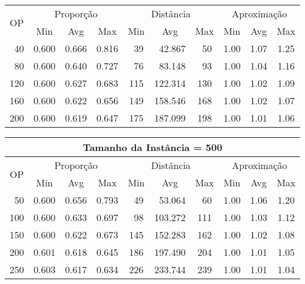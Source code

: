 \begin{table}[htbp]
\begin{center}
{\begin{tabular}{|c|c|c|c|c|c|c|c|c|c|}
\multirow{2}{*}{OP} & \multicolumn{3}{c|}{Proporção} & \multicolumn{3}{c|}{Distância} & \multicolumn{3}{c|}{Aproximação}   \\ \cline{2-10}
                    & Min       & Avg      & Max      & Min      & Avg      & Max     & Min     & Avg    & Max             \\ \hline
~40                 & 0.600     & 0.666    & 0.816    & ~39      & ~42.867  & ~50     & 1.00    & 1.07   & 1.25            \\ \hline
~80                 & 0.600     & 0.640    & 0.727    & ~76      & ~83.148  & ~93     & 1.00    & 1.04   & 1.16            \\ \hline
120                 & 0.600     & 0.627    & 0.683    & 115      & 122.314  & 130     & 1.00    & 1.02   & 1.09            \\ \hline
160                 & 0.600     & 0.622    & 0.656    & 149      & 158.546  & 168     & 1.00    & 1.02   & 1.07            \\ \hline
200                 & 0.600     & 0.619    & 0.647    & 175      & 187.099  & 198     & 1.00    & 1.01   & 1.06            \\ \hline
\end{tabular}%
\vspace{5pt}
\begin{tabular}{|c|c|c|c|c|c|c|c|c|c|}
\hline
\multicolumn{10}{|c|}{\bf Tamanho da Instância = 500}                                                                          \\ \hline
\multirow{2}{*}{OP} & \multicolumn{3}{c|}{Proporção} & \multicolumn{3}{c|}{Distância} & \multicolumn{3}{c|}{Aproximação}   \\ \cline{2-10}
                    & Min       & Avg      & Max      & Min      & Avg      & Max     & Min     & Avg    & Max             \\ \hline
~50                 & 0.600     & 0.656    & 0.793    & ~49      & ~53.064  & ~60     & 1.00    & 1.06   & 1.20            \\ \hline
100                 & 0.600     & 0.633    & 0.697    & ~98      & 103.272  & 111     & 1.00    & 1.03   & 1.12            \\ \hline
150                 & 0.600     & 0.622    & 0.673    & 145      & 152.283  & 162     & 1.00    & 1.02   & 1.08            \\ \hline
200                 & 0.601     & 0.618    & 0.645    & 186      & 197.490  & 204     & 1.00    & 1.01   & 1.05            \\ \hline
250                 & 0.603     & 0.617    & 0.634    & 226      & 233.744  & 239     & 1.00    & 1.01   & 1.04            \\ \hline
\end{tabular}%
}
\end{center}
\end{table}
